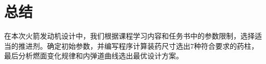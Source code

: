
\chapter{总结}

在本次火箭发动机设计中，我们根据课程学习内容和任务书中的参数限制，选择适当的推进剂。确定初始参数，并编写程序计算装药尺寸选出7种符合要求的药柱，最后分析燃面变化规律和内弹道曲线选出最优设计方案。